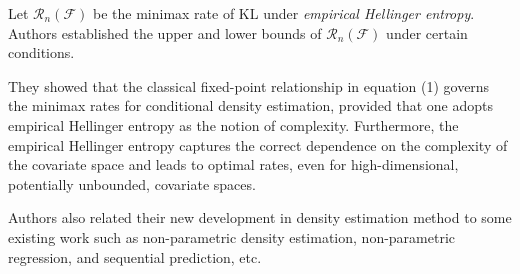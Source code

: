 \documentclass[11pt]{article}
\begin{document}
Let $\mathcal{R}_n(\mathcal{F})$ be the minimax rate of KL under {\emph{empirical Hellinger entropy}}. Authors established the upper and lower bounds of $\mathcal{R}_n(\mathcal{F})$ under certain conditions. 

They showed that the classical fixed-point relationship in equation (1) governs the minimax rates for conditional density estimation, provided that one adopts empirical Hellinger entropy as the notion of complexity. Furthermore, the empirical Hellinger entropy captures the correct dependence on the complexity of the covariate space and leads to optimal rates, even for high-dimensional, potentially unbounded, covariate spaces.  

Authors also related their new development in density estimation method to some existing work such as non-parametric density estimation, non-parametric regression, and sequential prediction, etc.
\end{document}
